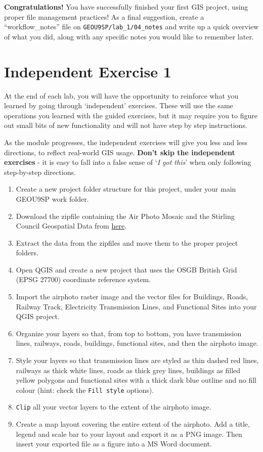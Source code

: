 \documentclass[
  letterpaper,
  DIV=11,
  numbers=noendperiod]{scrreprt}
\begin{document}
\textbf{Congratulations!} You have successfully finished your first GIS
project, using proper file management practices! As a final suggestion,
create a ``workflow\_notes'' file on \texttt{GEOU9SP/lab\_1/04\_notes}
and write up a quick overview of what you did, along with any specific
notes you would like to remember later.

\section{Independent Exercise 1}\label{independent-exercise-1}

At the end of each lab, you will have the opportunity to reinforce what
you learned by going through `independent' exercises. These will use the
same operations you learned with the guided exercises, but it may
require you to figure out small bits of new functionality and will not
have step by step instructions.

As the module progresses, the independent exercises will give you less
and less directions, to reflect real-world GIS usage. \textbf{Don't skip
the independent exercises} - it is easy to fall into a false sense of
`\emph{I got this}' when only following step-by-step directions.

\begin{enumerate}
\def\labelenumi{\arabic{enumi}.}
\item
  Create a new project folder structure for this project, under your
  main GEOU9SP work folder.
\item
  Download the zipfile containing the Air Photo Mosaic and the Stirling
  Council Geospatial Data from
  \href{https://stir-my.sharepoint.com/:u:/g/personal/ala2_stir_ac_uk/EWxq18uE5uRAjh_fGHf1qC4BRKxp-M4QTs0e1qttSa_m_Q?e=oPnFWQ}{here}.
\item
  Extract the data from the zipfiles and move them to the proper project
  folders.
\item
  Open QGIS and create a new project that uses the OSGB British Grid
  (EPSG 27700) coordinate reference system.
\item
  Import the airphoto raster image and the vector files for Buildings,
  Roads, Railway Track, Electricity Transmission Lines, and Functional
  Sites into your QGIS project.
\item
  Organize your layers so that, from top to bottom, you have
  transmission lines, railways, roads, buildings, functional sites, and
  then the airphoto image.
\item
  Style your layers so that transmission lines are styled as thin dashed
  red lines, railways as thick white lines, roads as thick grey lines,
  buildings as filled yellow polygons and functional sites with a thick
  dark blue outline and no fill colour (hint: check the
  \texttt{Fill\ style} options).
\item
  \texttt{Clip} all your vector layers to the extent of the airphoto
  image.
\item
  Create a map layout covering the entire extent of the airphoto. Add a
  title, legend and scale bar to your layout and export it as a PNG
  image. Then insert your exported file as a figure into a MS Word
  document.
\end{enumerate}
\end{document}
